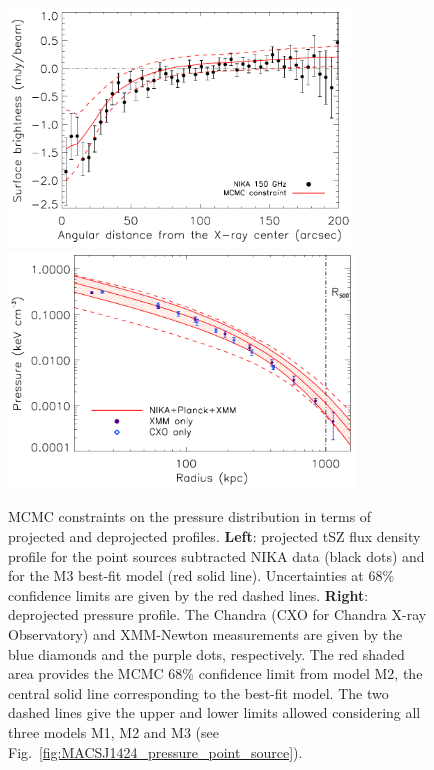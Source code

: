 \documentclass[twocolumn,traditabstract]{aa}
\begin{document}
\begin{figure}[h]
\centering
\includegraphics[height=6.3cm]{Figure/MACSJ1424_profile_ML.pdf}
\includegraphics[height=6.3cm]{Figure/ICM_pressure_profile_xray.pdf}
\caption{MCMC constraints on the pressure distribution in terms of projected and deprojected profiles. {\bf Left}: projected tSZ flux density profile for the point sources subtracted NIKA data (black dots) and for the M3 best-fit model (red solid line). Uncertainties at 68\% confidence limits are given by the red dashed lines. {\bf Right}: deprojected pressure profile. The Chandra (CXO for Chandra X-ray Observatory) and XMM-Newton measurements are given by the blue diamonds and the purple dots, respectively. The red shaded area provides the MCMC 68\% confidence limit from model M2, the central solid line corresponding to the best-fit model. The two dashed lines give the upper and lower limits allowed considering all three models M1, M2 and M3 (see Fig.~\ref{fig:MACSJ1424_pressure_point_source}).}
\label{fig:MACSJ1424_MCMC_pressure_profile}
\end{figure}
\end{document}
